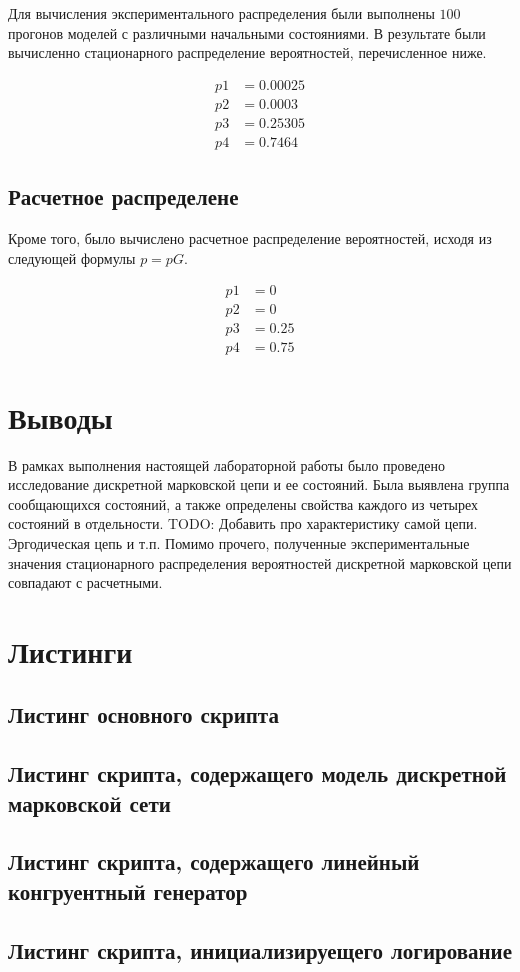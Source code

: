 Для вычисления экспериментального распределения были выполнены $100$ прогонов моделей с различными начальными состояниями.
В результате были вычисленно стационарного распределение вероятностей, перечисленное ниже.

\begin{align*}
    p1 & = 0.00025\\
    p2 & = 0.0003\\
    p3 & = 0.25305\\
    p4 & = 0.7464
\end{align*}

\subsection*{Расчетное распределене}

Кроме того, было вычислено расчетное распределение вероятностей, исходя из следующей формулы $p=pG$.

\begin{align*}
    p1 & = 0\\
    p2 & = 0\\
    p3 & = 0.25\\
    p4 & = 0.75
\end{align*}

\section*{Выводы}

В рамках выполнения настоящей лабораторной работы было проведено исследование дискретной марковской цепи и ее состояний.
Была выявлена группа сообщающихся состояний, а также определены свойства каждого из четырех состояний в отдельности.
TODO: Добавить про характеристику самой цепи. Эргодическая цепь и т.п.
Помимо прочего, полученные экспериментальные значения стационарного распределения вероятностей дискретной марковской цепи совпадают с
расчетными.

\section*{Листинги}

\subsection*{Листинг основного скрипта}


\subsection*{Листинг скрипта, содержащего модель дискретной марковской сети}


\subsection*{Листинг скрипта, содержащего линейный конгруентный генератор}


\subsection*{Листинг скрипта, инициализируещего логирование}

